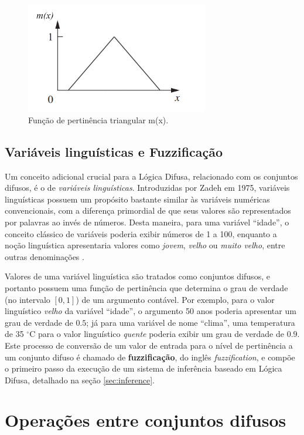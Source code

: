 \documentclass[12pt]{article}
\begin{document}
\begin{figure}[ht]
    \centering
    \includegraphics[width=8cm]{membership.png}
    \caption{Função de pertinência triangular m(x).}
    \label{fig:membership}
\end{figure}

\subsection{Variáveis linguísticas e Fuzzificação}

Um conceito adicional crucial para a Lógica Difusa, relacionado com os conjuntos difusos, é o de \textit{variáveis linguísticas}. Introduzidas por Zadeh em 1975, variáveis linguísticas possuem um propósito bastante similar às variáveis numéricas convencionais, com a diferença primordial de que seus valores são representados por palavras ao invés de números. Desta maneira, para uma variável ``idade'', o conceito clássico de variáveis poderia exibir números de 1 a 100, enquanto a noção linguística apresentaria valores como \textit{jovem}, \textit{velho} ou \textit{muito velho}, entre outras denominações \cite{Zadeh1975}.

Valores de uma variável linguística são tratados como conjuntos difusos, e portanto possuem uma função de pertinência que determina o grau de verdade (no intervalo $[0, 1]$) de um argumento contável. Por exemplo, para o valor linguístico \textit{velho} da variável ``idade'', o argumento 50 anos poderia apresentar um grau de verdade de $0.5$; já para uma variável de nome ``clima'', uma temperatura de 35 $^{\circ}$C para o valor linguístico \textit{quente} poderia exibir um grau de verdade de $0.9$. Este processo de conversão de um valor de entrada para o nível de pertinência a um conjunto difuso é chamado de \textbf{fuzzificação}, do inglês \textit{fuzzification}, e compõe o primeiro passo da execução de um sistema de inferência baseado em Lógica Difusa, detalhado na seção \ref{sec:inference}.

\section{Operações entre conjuntos difusos} \label{sec:operations}
\end{document}
